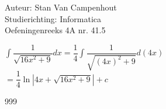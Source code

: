 \documentclass[a4paper]{article}
\begin{document}
  
\noindent \large Auteur: Stan Van Campenhout \\
\noindent \large Studierichting:  Informatica\\
\noindent \large Oefeningenreeks 4A nr. 41.5\\

\medskip

\normalsize

$ \displaystyle\int\dfrac{1}{\sqrt{16x^2 + 9}}dx = \dfrac{1}{4}\displaystyle\int\dfrac{1}{\sqrt{\left(4x\right)^2+9}}d\left(4x\right) $\\

$ = \dfrac{1}{4}\ln|4x+\sqrt{16x^2+9}| + c $\\

\begin{thebibliography}{999}
\end{thebibliography}
\end{document}
